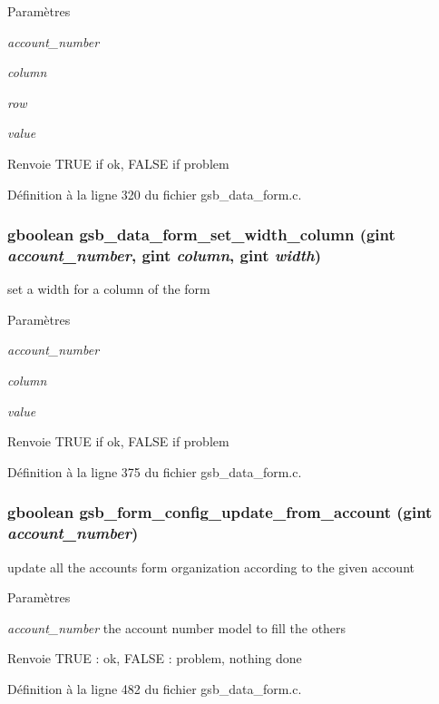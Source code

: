 \begin{DoxyParams}{Paramètres}
\item[{\em account\_\-number}]\item[{\em column}]\item[{\em row}]\item[{\em value}]\end{DoxyParams}
\begin{DoxyReturn}{Renvoie}
TRUE if ok, FALSE if problem 
\end{DoxyReturn}


Définition à la ligne 320 du fichier gsb\_\-data\_\-form.c.

\subsubsection[{gsb\_\-data\_\-form\_\-set\_\-width\_\-column}]{\setlength{\rightskip}{0pt plus 5cm}gboolean gsb\_\-data\_\-form\_\-set\_\-width\_\-column (gint {\em account\_\-number}, \/  gint {\em column}, \/  gint {\em width})}\label{gsb__data__form_8c_a18aec71c64bac7bd9c7da37e05254d3e}
set a width for a column of the form


\begin{DoxyParams}{Paramètres}
\item[{\em account\_\-number}]\item[{\em column}]\item[{\em value}]\end{DoxyParams}
\begin{DoxyReturn}{Renvoie}
TRUE if ok, FALSE if problem 
\end{DoxyReturn}


Définition à la ligne 375 du fichier gsb\_\-data\_\-form.c.

\subsubsection[{gsb\_\-form\_\-config\_\-update\_\-from\_\-account}]{\setlength{\rightskip}{0pt plus 5cm}gboolean gsb\_\-form\_\-config\_\-update\_\-from\_\-account (gint {\em account\_\-number})}\label{gsb__data__form_8c_a206bff690e4524f0bb5c42c1ab55b6a0}
update all the accounts form organization according to the given account


\begin{DoxyParams}{Paramètres}
\item[{\em account\_\-number}]the account number model to fill the others\end{DoxyParams}
\begin{DoxyReturn}{Renvoie}
TRUE : ok, FALSE : problem, nothing done 
\end{DoxyReturn}


Définition à la ligne 482 du fichier gsb\_\-data\_\-form.c.

